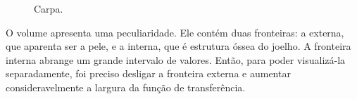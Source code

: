 \begin{figure}[h]
	\centering
	\caption{Carpa.}
	\label{fig:r_m_carp}
\end{figure}

\newpage
	O volume  apresenta uma peculiaridade. Ele contém duas fronteiras: a externa, que aparenta ser a pele, e a interna, que é estrutura óssea do joelho. A fronteira interna abrange um grande intervalo de valores. Então, para poder visualizá-la separadamente, foi preciso desligar a fronteira externa e aumentar consideravelmente a largura da função de transferência.

